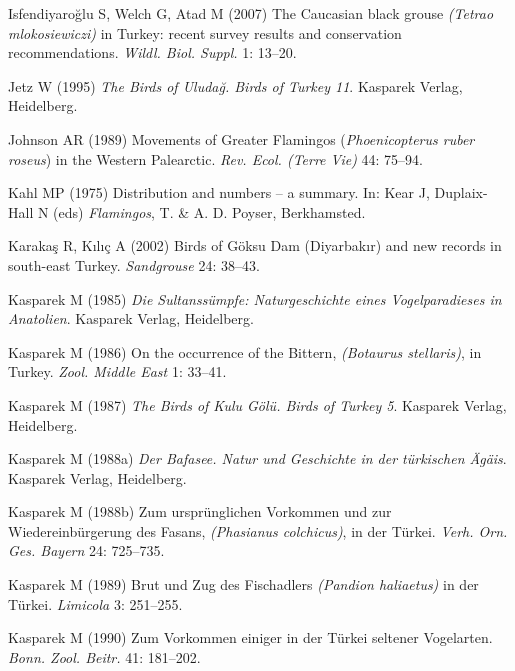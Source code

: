 \documentclass[
  letterpaper,
  DIV=11,
  numbers=noendperiod]{scrreprt}
\newlength{\cslhangindent}
\newenvironment{CSLReferences}[2] %
 {\begin{list}{}{%
  \setlength{\itemindent}{0pt}
  \setlength{\leftmargin}{0pt}
  \setlength{\parsep}{0pt}
  \ifodd #1
   \setlength{\leftmargin}{\cslhangindent}
   \setlength{\itemindent}{-1\cslhangindent}
  \fi
  \setlength{\itemsep}{#2\baselineskip}}}
 {\end{list}}
\begin{document}
\begin{CSLReferences}{0}{1}
Isfendiyaroğlu S, Welch G, Atad M (2007) {The Caucasian black grouse
\emph{(Tetrao mlokosiewiczi)} in Turkey: recent survey results and
conservation recommendations}. \emph{Wildl. Biol. Suppl.} 1: 13--20.

Jetz W (1995) \emph{{The Birds of Uludağ. Birds of Turkey 11}}. Kasparek
Verlag, Heidelberg.

Johnson AR (1989) {Movements of Greater Flamingos (\emph{Phoenicopterus
ruber roseus}) in the Western Palearctic}. \emph{Rev. Ecol. (Terre Vie)}
44: 75--94.

Kahl MP (1975) {Distribution and numbers -- a summary}. In: Kear J,
Duplaix-Hall N (eds) \emph{Flamingos}, T. \& A. D. Poyser, Berkhamsted.

Karakaş R, Kılıç A (2002) {Birds of Göksu Dam (Diyarbakır) and new
records in south-east Turkey}. \emph{Sandgrouse} 24: 38--43.

Kasparek M (1985) \emph{{Die Sultanssümpfe: Naturgeschichte eines
Vogelparadieses in Anatolien}}. Kasparek Verlag, Heidelberg.

Kasparek M (1986) {On the occurrence of the Bittern, \emph{(Botaurus
stellaris)}, in Turkey}. \emph{Zool. Middle East} 1: 33--41.

Kasparek M (1987) \emph{{The Birds of Kulu Gölü. Birds of Turkey 5}}.
Kasparek Verlag, Heidelberg.

Kasparek M (1988a) \emph{{Der Bafasee. Natur und Geschichte in der
türkischen Ägäis}}. Kasparek Verlag, Heidelberg.

Kasparek M (1988b) {Zum ursprünglichen Vorkommen und zur
Wiedereinbürgerung des Fasans, \emph{(Phasianus colchicus)}, in der
Türkei}. \emph{Verh. Orn. Ges. Bayern} 24: 725--735.

Kasparek M (1989) {Brut und Zug des Fischadlers \emph{(Pandion
haliaetus)} in der Türkei}. \emph{Limicola} 3: 251--255.

Kasparek M (1990) {Zum Vorkommen einiger in der Türkei seltener
Vogelarten}. \emph{Bonn. Zool. Beitr.} 41: 181--202.


\end{CSLReferences}
\end{document}
